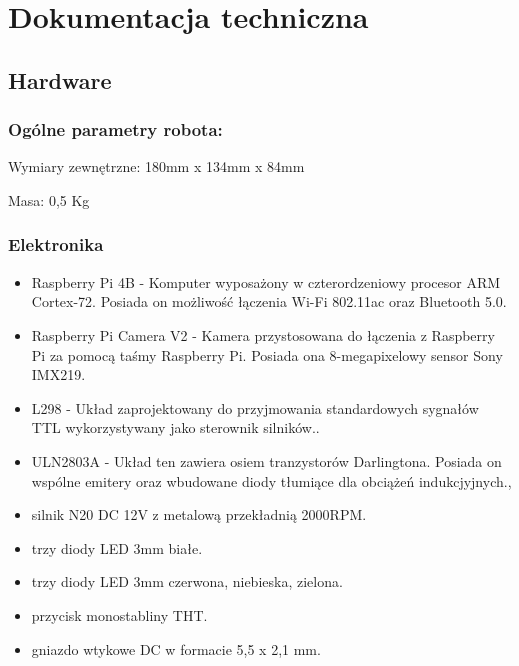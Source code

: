 \section{Dokumentacja techniczna}
\subsection{Hardware}
\label{subsec:hardware}
\subsubsection{Ogólne parametry robota:}
Wymiary zewnętrzne: 180mm x  134mm x 84mm

Masa: 0,5 Kg

\subsubsection{Elektronika}
    \begin{itemize}
        \item Raspberry Pi 4B - Komputer wyposażony w czterordzeniowy procesor ARM Cortex-72. Posiada on możliwość łączenia Wi-Fi 802.11ac oraz Bluetooth 5.0. \cite{malina}
        \item Raspberry Pi Camera V2 - Kamera przystosowana do łączenia z Raspberry Pi za pomocą taśmy Raspberry Pi. Posiada ona 8-megapixelowy sensor Sony IMX219. \cite{malina}
        \item L298 - Układ zaprojektowany do przyjmowania standardowych sygnałów TTL wykorzystywany jako sterownik silników.\cite{L298}.
        \item ULN2803A - Układ ten zawiera osiem tranzystorów Darlingtona. Posiada on wspólne emitery oraz wbudowane diody tłumiące dla obciążeń indukcjyjnych.\cite{ULN2803a},
        \item silnik N20 DC 12V z metalową przekładnią 2000RPM.
        \item trzy diody LED 3mm białe.
        \item trzy diody LED 3mm czerwona, niebieska, zielona.
        \item przycisk monostabliny THT.
        \item gniazdo wtykowe DC w formacie 5,5 x 2,1 mm.
    \end{itemize}

